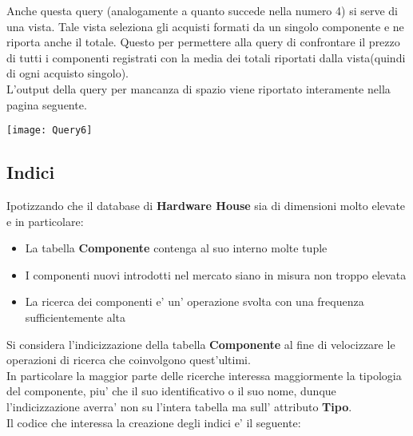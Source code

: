\begin{enumerate}
Anche questa query (analogamente a quanto succede nella numero 4) si serve di una vista. Tale vista seleziona gli acquisti formati da un singolo componente e ne riporta anche il totale. Questo per permettere alla query di confrontare il prezzo di tutti i componenti registrati con la media dei totali riportati dalla vista(quindi di ogni acquisto singolo).\\
L'output della query per mancanza di spazio viene riportato interamente nella pagina seguente.\\
\begin{center}
\texttt{[image: Query6]}
\end{center}

\end{enumerate}


\subsection{Indici} 

Ipotizzando che il database di \textbf{Hardware House} sia di dimensioni molto elevate e in particolare:
\begin{itemize}
\item La tabella \textbf{Componente} contenga al suo interno molte tuple
\item I componenti nuovi introdotti nel mercato siano in misura non troppo elevata
\item La ricerca dei componenti e' un' operazione svolta con una frequenza sufficientemente alta
\end{itemize}

Si considera l'indicizzazione della tabella \textbf{Componente} al fine di velocizzare le operazioni di ricerca che coinvolgono quest'ultimi.\\ 
In particolare la maggior parte delle ricerche interessa maggiormente la tipologia del componente, piu' che il suo identificativo o il suo nome, dunque l'indicizzazione averra' non su l'intera tabella ma sull' attributo \textbf{Tipo}.\\
Il codice che interessa la creazione degli indici e' il seguente:\\




